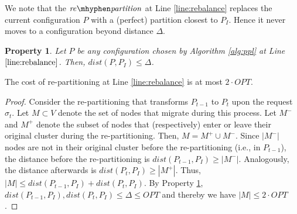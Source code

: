 \documentclass[manuscript,screen=true]{acmart}
\newcommand{\OPT}{\mathit{OPT}}
\newtheorem{property}{Property}
\newcommand\maciek[1]{\color{brown}\textbf{\\ Maciek: #1}\color{black}}
\begin{document}
      We note that the $\mathit{re\mhyphen partition}$ at Line \ref{line:rebalance} replaces the current configuration $P$ with a (perfect) partition closest to $P_I$.
Hence it never moves to a configuration beyond distance $\Delta$.      
\begin{property} \label{prop:dist<OPT}
    Let $P$ be any configuration chosen by Algorithm \ref{alg:ppl} at Line $\ref{line:rebalance}$.
    Then, $\mathit{dist}(P,P_I) \leq \Delta$.
\end{property}

\begin{lemma}	\label{lemma:rebalancecost}
    The cost of re-partitioning at Line \ref{line:rebalance} is at most $2\cdot\OPT$.
\end{lemma}
\begin{proof}
    Consider the re-partitioning that transforms $P_{t-1}$ to $P_t$ upon the request $\sigma_t$.
    Let $M \subset V$ denote the set of nodes that migrate during this process.
	Let $M^-$ and $M^+$ denote the subset of nodes that (respectively)
    enter or leave their original cluster during the re-partitioning.    
    Then,
    $M = M^+ \cup M^-$.
    Since $|M^-|$ nodes are not in their original cluster before the re-partitioning (i.e., in $P_{t-1}$),
    the distance before the re-partitioning is $\mathit{dist}(P_{t-1},P_I) \geq | M^-|$.
    Analogously,
     the distance afterwards is $\mathit{dist}(P_{t},P_I) \geq | M^+|$.
    Thus,
    $|M| \leq \mathit{dist}(P_{t-1},P_I) + \mathit{dist}(P_{t},P_I)$.
    By Property \ref{prop:dist<OPT},
    $\mathit{dist}(P_{t-1},P_I) , \mathit{dist}(P_{t},P_I) \leq \Delta \leq \OPT$
    and thereby we have	
    $|M| \leq 2\cdot\OPT$.
\end{proof}
\end{document}
